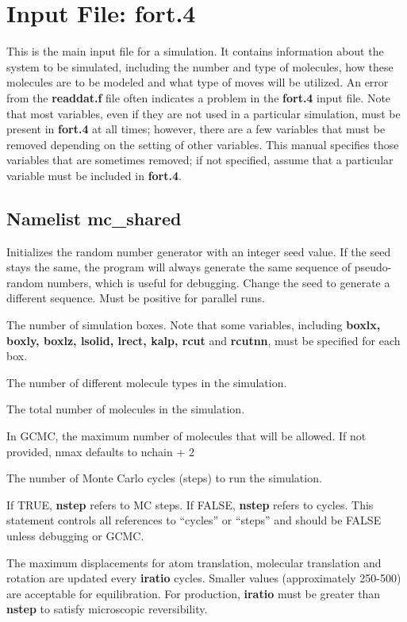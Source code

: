 \documentclass[12pt,letterpaper]{article}
\begin{document}
\section{Input File: \textbf{fort.4}}
This is the main input file for a simulation. It contains
information about the system to be simulated, including the
number and type of molecules, how these molecules are to be
modeled and what type of moves will be utilized. An error
from the {\bf readdat.f} file often indicates a problem in
the {\bf fort.4} input file. Note that most variables, even
if they are not used in a particular simulation, must be
present in {\bf fort.4} at all times; however, there are a
few variables that must be removed depending on the setting
of other variables. This manual specifies those variables
that are sometimes removed; if not specified, assume that a
particular variable must be included in {\bf fort.4}.

\subsection{Namelist \textbf{mc\_shared}}
 Initializes the random number generator
with an integer seed value. If the seed stays the same, the
program will always generate the same sequence of
pseudo-random numbers, which is useful for debugging. Change
the seed to generate a different sequence. Must be positive
for parallel runs.

 The number of simulation boxes. Note
that some variables, including {\bf boxlx, boxly, boxlz,
  lsolid, lrect, kalp, rcut} and {\bf rcutnn}, must be
specified for each box.

 The number of different molecule
types in the simulation.

 The total number of molecules in the simulation.

 In GCMC, the maximum number of molecules that
will be allowed. If not provided, nmax defaults to nchain + 2

 The number of Monte Carlo cycles
(steps) to run the simulation.

 If TRUE, {\bf nstep} refers to MC
steps. If FALSE, {\bf nstep} refers to cycles. This
statement controls all references to ``cycles'' or ``steps''
and should be FALSE unless debugging or GCMC.

 The maximum displacements for atom
translation, molecular translation and rotation are updated
every {\bf iratio} cycles. Smaller values (approximately
250-500) are acceptable for equilibration. For production,
{\bf iratio} must be greater than {\bf nstep} to satisfy
microscopic reversibility.
\end{document}
